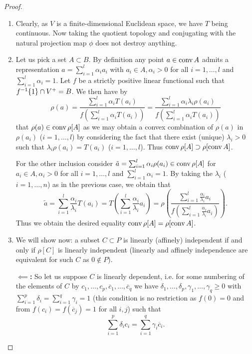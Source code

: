 \documentclass{article}
\begin{document}
\begin{proof}
\begin{enumerate}
\item Clearly, as $V$ is a finite-dimensional Euclidean space, we have $T$ being continuous. Now taking the quotient topology and conjugating with the natural projection map $\phi$ does not destroy anything. 
\item Let us pick a set $A\subset B$. By definition any point $a\in\operatorname{conv}{A}$ admits a representation $a=\sum_{i=1}^l{\alpha_i a_i}$ with $a_i\in A, \alpha_i>0$ for all $i=1,\ldots,l$ and $\sum_{i=1}^l{\alpha_i}=1$. Let $f$ be a strictly positive linear functional such that $f^{-1}\{1\}\cap V^+=B$. We then have by 
\begin{equation}
\rho(a)=\frac{\sum_{i=1}^l{\alpha_i T(a_i)}}{f\left(\sum_{i=1}^l{\alpha_i T(a_i)}\right)}=\frac{\sum_{i=1}^l{\alpha_i\lambda_i\rho(a_i)}}{f\left(\sum_{i=1}^l{\alpha_i T(a_i)}\right)}\label{eq1}
\end{equation}
that $\rho(a)\in\operatorname{conv}\rho[A]$ as we may obtain a convex combination of $\rho(a)$ in $\rho(a_i)$ ($i=1,\ldots,l$) by considering the fact that there exist (unique) $\lambda_i>0$ such that $\lambda_i\rho(a_i)=T(a_i)$ ($i=1,\ldots,l$). Thus $\operatorname{conv}\rho[A]\supset\rho[\operatorname{conv} A]$.

For the other inclusion consider $\tilde{a}=\sum_{i=1}^l{\alpha_i \rho(a_i)}\in\operatorname{conv}\rho[A]$ for $a_i\in A, \alpha_i>0$ for all $i=1,\ldots,l$ and $\sum_{i=1}^l{\alpha_i}=1$. By taking the $\lambda_i$ ($i=1,\ldots,n$) as in the previous case, we obtain that
\begin{equation}
\tilde{a}=\sum_{i=1}^l{\frac{\alpha_i}{\lambda_i} T(a_i)}=T\left(\sum_{i=1}^l{\frac{\alpha_i}{\lambda_i} a_i}\right)=\rho\left(\frac{\sum_{i=1}^l{\frac{\alpha_i}{\lambda_i} a_i}}{f\left(\sum_{i=1}^l{\frac{\alpha_i}{\lambda_i} a_i}\right)}\right)\text{.}\label{eq2}
\end{equation}
Thus we obtain the desired equality $\operatorname{conv}\rho[A]=\rho[\operatorname{conv} A]$.
\item We will show now: a subset $C\subset P$ is linearly (affinely) independent if and only if $\rho[C]$ is linearly independent (linearly and affinely independence are equivalent for such $C$ as $0\not\in P$).

\textbf{$\impliedby$:} So let us suppose $C$ is linearly dependent, i.e. for some numbering of the elements of $C$ by $c_1,\ldots,c_p,\overline{c}_1,\ldots,\overline{c}_q$ we have $\delta_1,\ldots,\delta_p,\gamma_1,\ldots,\gamma_q\geq 0$ with $\sum_{i=1}^p{\delta_i}=\sum_{i=1}^q{\gamma_i}=1$ (this condition is no restriction as $f(0)=0$ and from $f(c_i)=f(\overline{c}_j)=1$ for all $i,j$) such that 
\begin{equation}
\sum_{i=1}^p{\delta_i c_i}=\sum_{i=1}^q{\gamma_i \overline{c}_i}\text{.}\label{eq3}
\end{equation}


\end{enumerate}
\end{proof}
\end{document}
